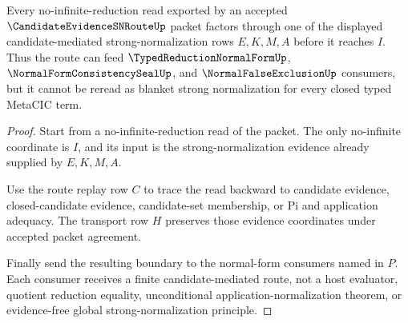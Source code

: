 \begin{theorem}
\label{thm:candidate-evidence-sn-route-no-infinite-boundary}
Every no-infinite-reduction read exported by an accepted $\CandidateEvidenceSNRouteUp$ packet factors through one of the displayed candidate-mediated strong-normalization rows $E,K,M,A$ before it reaches $I$. Thus the route can feed $\TypedReductionNormalFormUp$, $\NormalFormConsistencySealUp$, and $\NormalFalseExclusionUp$ consumers, but it cannot be reread as blanket strong normalization for every closed typed MetaCIC term.
\end{theorem}
\begin{proof}
Start from a no-infinite-reduction read of the packet. The only no-infinite coordinate is $I$, and its input is the strong-normalization evidence already supplied by $E,K,M,A$.

Use the route replay row $C$ to trace the read backward to candidate evidence, closed-candidate evidence, candidate-set membership, or Pi and application adequacy. The transport row $H$ preserves those evidence coordinates under accepted packet agreement.

Finally send the resulting boundary to the normal-form consumers named in $P$. Each consumer receives a finite candidate-mediated route, not a host evaluator, quotient reduction equality, unconditional application-normalization theorem, or evidence-free global strong-normalization principle.
\end{proof}


\begin{closurestatus}{\CandidateEvidenceSNRouteUp}
  \theoryclosure{\seedClosure}
  \formalstatus{\unformalizedV}
\end{closurestatus}
